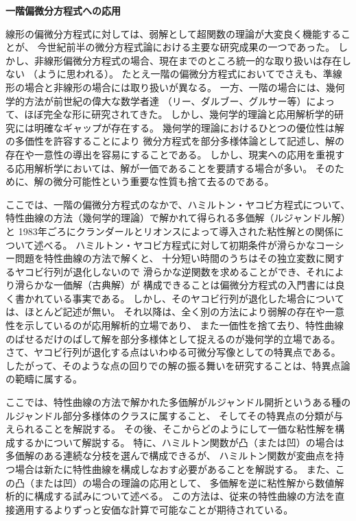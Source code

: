 \documentclass[uplatex,dvipdfmx]{jlreq}
\begin{document}
\begin{center}
{\large\bfseries 一階偏微分方程式への応用}

\hspace*{\fill}{\large\bfseries 泉屋 周一（北大・理）}
\end{center}

\medskip

線形の偏微分方程式に対しては、弱解として超関数の理論が大変良く機能することが、
今世紀前半の微分方程式論における主要な研究成果の一つであった。
しかし、非線形偏微分方程式の場合、現在までのところ統一的な取り扱いは存在しない
（ように思われる）。
たとえ一階の偏微分方程式においてでさえも、準線形の場合と非線形の場合には取り扱いが異なる。
一方、一階の場合には、幾何学的方法が前世紀の偉大な数学者達
（リー、ダルブー、グルサー等）によって、ほぼ完全な形に研究されてきた。
しかし、幾何学的理論と応用解析学的研究には明確なギャップが存在する。
幾何学的理論におけるひとつの優位性は解の多価性を許容することにより
微分方程式を部分多様体論として記述し、解の存在や一意性の導出を容易にすることである。
しかし、現実への応用を重視する応用解析学においては、解が一価であることを要請する場合が多い。
そのために、解の微分可能性という重要な性質も捨て去るのである。

ここでは、一階の偏微分方程式のなかで、ハミルトン・ヤコビ方程式について、
特性曲線の方法（幾何学的理論）で解かれて得られる多価解（ルジャンドル解）と
1983年ごろにクランダールとリオンスによって導入された粘性解との関係について述べる。
ハミルトン・ヤコビ方程式に対して初期条件が滑らかなコーシー問題を特性曲線の方法で解くと、
十分短い時間のうちはその独立変数に関するヤコビ行列が退化しないので
滑らかな逆関数を求めることができ、それにより滑らかな一価解（古典解）が
構成できることは偏微分方程式の入門書には良く書かれている事実である。
しかし、そのヤコビ行列が退化した場合については、ほとんど記述が無い。
それ以降は、全く別の方法により弱解の存在や一意性を示しているのが応用解析的立場であり、
また一価性を捨て去り、特性曲線のばせるだけのばして解を部分多様体として捉えるのが幾何学的立場である。
さて、ヤコビ行列が退化する点はいわゆる可微分写像としての特異点である。
したがって、そのような点の回りでの解の振る舞いを研究することは、特異点論の範疇に属する。

ここでは、特性曲線の方法で解かれた多価解がルジャンドル開折というある種の
ルジャンドル部分多様体のクラスに属すること、
そしてその特異点の分類が与えられることを解説する。
その後、そこからどのようにして一価な粘性解を構成するかについて解説する。
特に、ハミルトン関数が凸（または凹）の場合は多価解のある連続な分枝を選んで構成できるが、
ハミルトン関数が変曲点を持つ場合は新たに特性曲線を構成しなおす必要があることを解説する。
また、この凸（または凹）の場合の理論の応用として、
多価解を逆に粘性解から数値解析的に構成する試みについて述べる。
この方法は、従来の特性曲線の方法を直接適用するよりずっと安価な計算で可能なことが期待されている。
\end{document}
